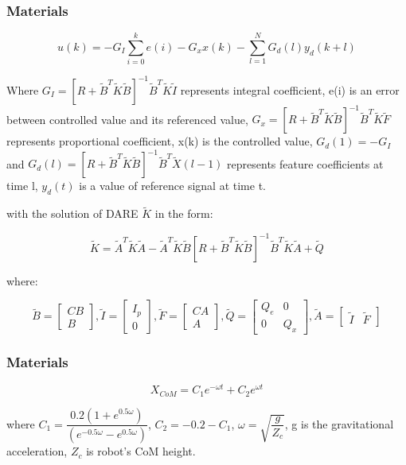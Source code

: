 \documentclass{beamer}
\begin{document}
	\begin{frame}
		\frametitle{Materials} 
		
		\begin{equation}\label{eq:pc1}
		u(k) = -G_I \sum^{k}_{i=0} e(i) - G_xx(k) - \sum^{N}_{l=1}G_d(l)y_d(k+l)
		\end{equation}
		
		Where $G_I = [R+\tilde{B}^T \tilde{K} \tilde{B}]^{-1} \tilde{B}^T \tilde{K} \tilde{I}$ represents integral coefficient, e(i) is an error between controlled value and its referenced value, $G_x = [R+\tilde{B}^T \tilde{K} \tilde{B}]^{-1} \tilde{B}^T \tilde{K} \tilde{F}$ represents proportional coefficient, x(k) is the controlled value, $G_d(1) = -G_I$ and $G_d(l) = [R+\tilde{B}^T \tilde{K} \tilde{B}]^{-1} \tilde{B}^T \tilde{X}(l-1)$ represents feature coefficients at time l, $y_d(t)$ is a value of reference signal at time t.
		
		with the solution of DARE $\tilde{K}$ in the form:
		
		\begin{equation}\label{eq:pc2}
		\tilde{K} = \tilde{A}^T\tilde{K}\tilde{A} - \tilde{A}^T \tilde{K} \tilde{B} [R + \tilde{B}^T \tilde{K} \tilde{B}]^{-1} \tilde{B}^T\tilde{K}\tilde{A} + \tilde{Q}
		\end{equation}
		
		where:
		
		\begin{equation}\label{eq:pc3}
		\tilde{B} = \begin{bmatrix} C B \\ B \end{bmatrix},
		\tilde{I} = \begin{bmatrix} I_p \\ 0 \end{bmatrix},
		\tilde{F} = \begin{bmatrix} CA \\ A \end{bmatrix},
		\tilde{Q} = \begin{bmatrix} Q_e & 0 \\ 0 & Q_x \end{bmatrix},
		\tilde{A} = \begin{bmatrix} \tilde{I} & \tilde{F} \end{bmatrix}
		\end{equation}
	\end{frame}
	

	\begin{frame}
		\frametitle{Materials} 
		
		\begin{equation}
		X_{CoM} = C_1 e^{-\omega t} + C_2 e^{\omega t}
		\end{equation}
		
		where $C_1 = \dfrac{0.2(1+e^{0.5\omega })}{(e^{-0.5\omega }-e^{0.5\omega })}$, $C_2=-0.2-C_1$, $\omega = \sqrt{\dfrac{g}{Z_c}}$, g is the gravitational acceleration, $Z_c$ is robot's CoM height.
	\end{frame}
		
\end{document}
